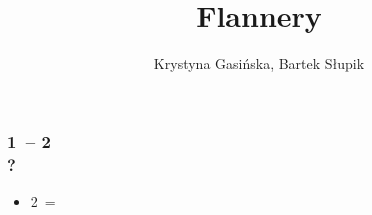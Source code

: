 \documentclass[12pt, a4paper]{article}
\title{Flannery}
\author{Krystyna Gasińska, Bartek Słupik}
\begin{document}
\maketitle


\subsubsection*{1\minor\ -- 2\hearts \\ ?}
\begin{itemize}
    \item 2\nt\ = \lsf \vimp
\end{itemize}

\end{document}
